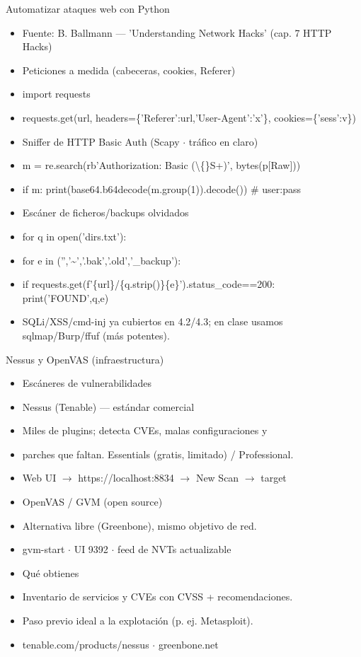 \documentclass[aspectratio=169,10pt]{beamer}
\begin{document}
\begin{frame}[allowframebreaks]{Automatizar ataques web con Python}
\small
  \begin{itemize}
  \item Fuente: B. Ballmann --- 'Understanding Network Hacks' (cap. 7 HTTP Hacks)
  \item Peticiones a medida (cabeceras, cookies, Referer)
  \item import requests
  \item requests.get(url, headers=\{'Referer':url,'User-Agent':'x'\}, cookies=\{'sess':v\})
  \item Sniffer de HTTP Basic Auth (Scapy $\cdot$ tráfico en claro)
  \item m = re.search(rb'Authorization: Basic (\textbackslash\{\}S+)', bytes(p[Raw]))
  \item if m: print(base64.b64decode(m.group(1)).decode()) \# user:pass
  \item Escáner de ficheros/backups olvidados
  \item for q in open('dirs.txt'):
  \item for e in ('','\textasciitilde{}','.bak','.old','\_backup'):
  \item if requests.get(f'\{url\}/\{q.strip()\}\{e\}').status\_code==200: print('FOUND',q,e)
  \item SQLi/XSS/cmd-inj ya cubiertos en 4.2/4.3; en clase usamos sqlmap/Burp/ffuf (más potentes).
  \end{itemize}
\end{frame}

\begin{frame}[allowframebreaks]{Nessus y OpenVAS (infraestructura)}
\small
  \begin{itemize}
  \item Escáneres de vulnerabilidades
  \item Nessus (Tenable) --- estándar comercial
  \item Miles de plugins; detecta CVEs, malas configuraciones y
  \item parches que faltan. Essentials (gratis, limitado) / Professional.
  \item Web UI $\rightarrow$ https://localhost:8834 $\rightarrow$ New Scan $\rightarrow$ target
  \item OpenVAS / GVM (open source)
  \item Alternativa libre (Greenbone), mismo objetivo de red.
  \item gvm-start $\cdot$ UI 9392 $\cdot$ feed de NVTs actualizable
  \item Qué obtienes
  \item Inventario de servicios y CVEs con CVSS + recomendaciones.
  \item Paso previo ideal a la explotación (p. ej. Metasploit).
  \item tenable.com/products/nessus $\cdot$ greenbone.net
  \end{itemize}
\end{frame}
\end{document}
